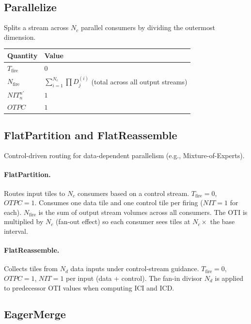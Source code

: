 \documentclass[10pt]{article}
\begin{document}
\subsection{Parallelize}

Splits a stream across $N_c$ parallel consumers by dividing the outermost dimension.

\begin{table}[h]
\centering
\begin{tabular}{@{}ll@{}}
\toprule
\textbf{Quantity} & \textbf{Value} \\
\midrule
$T_{\text{fire}}$ & $0$ \\
$N_{\text{fire}}$ & $\sum_{i=1}^{N_c} \prod D^{(i)}_j$ \quad (total across all output streams) \\
$\mathit{NIT}^{n'}_n$ & $1$ \\
$\mathit{OTPC}$ & $1$ \\
\bottomrule
\end{tabular}
\end{table}

\subsection{FlatPartition and FlatReassemble}

Control-driven routing for data-dependent parallelism (e.g., Mixture-of-Experts).

\paragraph{FlatPartition.} Routes input tiles to $N_c$ consumers based on a control stream. $T_{\text{fire}} = 0$, $\mathit{OTPC} = 1$. Consumes one data tile and one control tile per firing ($\mathit{NIT} = 1$ for each). $N_{\text{fire}}$ is the sum of output stream volumes across all consumers. The OTI is multiplied by $N_c$ (fan-out effect) so each consumer sees tiles at $N_c \times$ the base interval.

\paragraph{FlatReassemble.} Collects tiles from $N_d$ data inputs under control-stream guidance. $T_{\text{fire}} = 0$, $\mathit{OTPC} = 1$, $\mathit{NIT} = 1$ per input (data + control). The fan-in divisor $N_d$ is applied to predecessor OTI values when computing ICI and ICD.

\subsection{EagerMerge}
\end{document}
